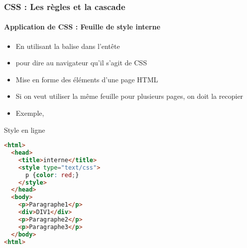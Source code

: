 \documentclass[xcolor=table]{beamer}
\begin{document}
\begin{frame}[fragile]
\frametitle{CSS : Les règles et la cascade}
\framesubtitle{Application de CSS : Feuille de style interne}

\begin{minipage}{0.60\textwidth} 
	\begin{itemize}
		\item En utilisant la balise  dans l'entête
		\item {} pour dire au navigateur qu'il s'agit de CSS
		\item Mise en forme des éléments d'une page HTML
		\item Si on veut utiliser la même feuille pour plusieurs pages, on doit la recopier
		\item Exemple, 
	\end{itemize}
\end{minipage}
%
\begin{minipage}{0.38\textwidth}
\begin{block}{Style en ligne}
\lstset{escapeinside=**}
\scriptsize\bfseries
\begin{lstlisting}[language={html}]
<html>
  <head>
    <title>interne</title>
    <style type="text/css">
      p {color: red;}
    </style>
  </head>
  <body>
    <p>Paragraphe1</p>
    <div>DIV1</div>
    <p>Paragraphe2</p>
    <p>Paragraphe3</p>
  </body>
<html>
\end{lstlisting}
\end{block}
\end{minipage}
\end{frame}
\end{document}
